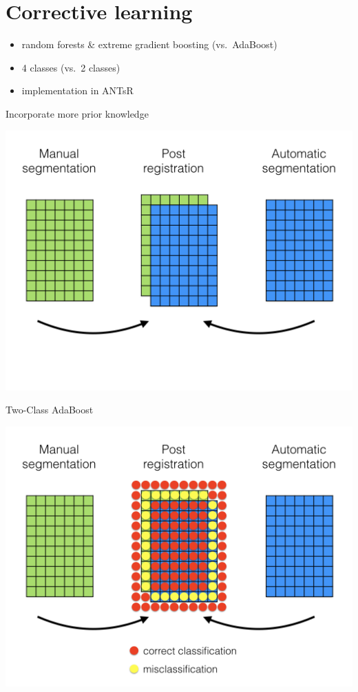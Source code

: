\documentclass[ignorenonframetext,]{beamer}
\providecommand{\tightlist}{%
  \setlength{\itemsep}{0pt}\setlength{\parskip}{0pt}}
\begin{document}
\section{Corrective learning}\label{corrective-learning}

\begin{itemize}
\tightlist
\item
  random forests \& extreme gradient boosting (vs.~AdaBoost)
\item
  4 classes (vs.~2 classes)
\item
  implementation in ANTsR
\end{itemize}

\begin{frame}{Incorporate more prior knowledge}

\centering
\includegraphics[width=0.85 \textwidth]{../Figures/correctiveLearning001.png}

\end{frame}

\begin{frame}{Two-Class AdaBoost}

\centering
\includegraphics[width=0.85 \textwidth]{../Figures/correctiveLearning002.png}

\end{frame}
\end{document}
